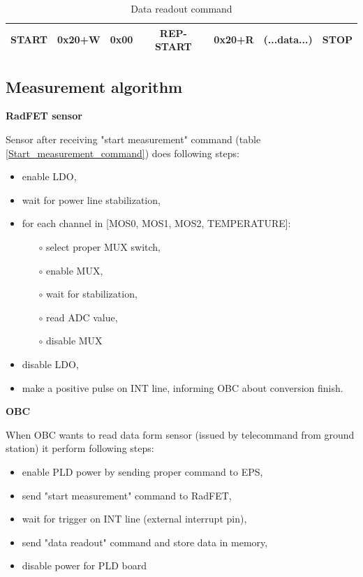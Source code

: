     \begin{table}[H]
        \begin{center}
            \begin{tabular}{|c|c|c|c|c|c|c|}
                \hline
                START & 0x20+W & 0x00 & REP-START & 0x20+R & (...data...) & STOP \\ \hline
            \end{tabular}
        \end{center}
        \caption{Data readout command}
        \label{Data_readout_command}
    \end{table}

    \subsection{Measurement algorithm}
    \bigskip \textbf{RadFET sensor}

    Sensor after receiving "start measurement" command (table \ref{Start_measurement_command}) does following steps:
    \begin{itemize}
        \item enable LDO,
        \item wait for power line stabilization,
        \item for each channel in [MOS0, MOS1, MOS2, TEMPERATURE]:
        \begin{itemize}
            \item[$\circ$] select proper MUX switch,
            \item[$\circ$] enable MUX,
            \item[$\circ$] wait for stabilization,
            \item[$\circ$] read ADC value,
            \item[$\circ$] disable MUX
        \end{itemize}
        \item disable LDO,
        \item make a positive pulse on INT line, informing OBC about conversion finish.
    \end{itemize}

    \bigskip \textbf{OBC}

    When OBC wants to read data form sensor (issued by telecommand from ground station) it perform following steps:
    \begin{itemize}
        \item enable PLD power by sending proper command to EPS,
        \item send "start measurement" command to RadFET,
        \item wait for trigger on INT line (external interrupt pin),
        \item send "data readout" command and store data in memory,
        \item disable power for PLD board
    \end{itemize}


